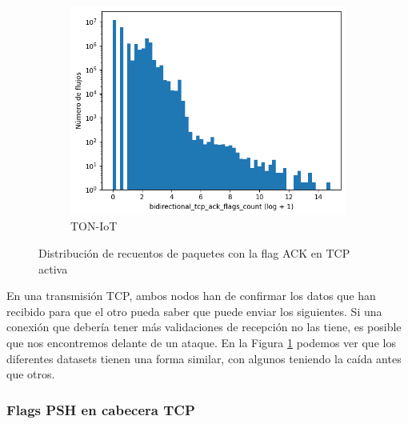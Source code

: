 \begin{figure}[H]
    \begin{subfigure}[b]{0.32\textwidth}
        \centering
        \includegraphics[width=\linewidth]{media/packet_pincer_toniot/bidirectional_tcp_ack_flags_count_log_x_log_y.png}
        \caption{TON-IoT}
    \end{subfigure}
       \caption{Distribución de recuentos de paquetes con la flag ACK en TCP activa}
       \label{fig:packet_pincer_bidirectional_tcp_ack_flags_count}
\end{figure}

En una transmisión TCP, ambos nodos han de confirmar los datos que han recibido para que el otro pueda saber que puede enviar los siguientes. Si una conexión que debería tener más validaciones de recepción no las tiene, es posible que nos encontremos delante de un ataque. En la Figura \ref{fig:packet_pincer_bidirectional_tcp_ack_flags_count} podemos ver que los diferentes datasets tienen una forma similar, con algunos teniendo la caída antes que otros.

\subsubsection{Flags PSH en cabecera TCP}

